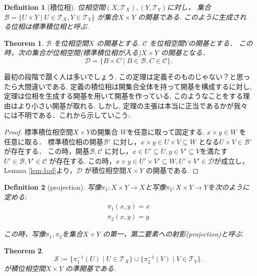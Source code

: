 \documentclass[dvipdfmx]{jbook}
\newtheorem{theorem}{Theorem}[section]
\newtheorem{definition}{Definition}[section]
\theoremstyle{remark}
\theoremstyle{plain}
\begin{document}
\begin{definition}[積位相]
	位相空間$(X,\mathcal{T}_X),(Y,\mathcal{T}_Y)$に対し， 
	集合$\mathcal{B}=\{ U \times Y  \mid U \in \mathcal{T}_X, Y \in \mathcal{T}_Y\}$ が集合$X \times Y$ の開基である.
	このように生成される位相は標準積位相と呼ぶ.
\end{definition}

\begin{theorem}
$\mathcal{B}$ を位相空間$X$ の開基とする.
$\mathcal{C}$ を位相空間$Y$の開基とする．
この時，次の集合が位相空間(標準積位相が入る)$X \times Y$ の開基となる．
\[
\mathcal{D}= \{B \times C  \mid B \in \mathcal{B} , C \in \mathcal{C} \}
.\] 
\end{theorem}

最初の段階で躓く人は多いでしょう.
この定理は定義そのものじゃない？と思ったら大間違いである. 
定義の積位相は開集合全体を持って開基を構成するに対し, 定理は位相を生成する開基を用いて開基を作っている, このようなことをする理由はより小さい開基が取れる. しかし, 定理の主張は本当に正当であるかが我々には不明である．これから示していこう:

\begin{proof}
	標準積位相空間$X \times Y$の開集合 $W$を任意に取って固定する. 
	$x\times y \in W$ を任意に取る．
	標準積位相の開基$\mathcal{B'}$ に対し，$x \times y \in U \times V \subseteq W$ となる$U \times V \in \mathcal{B'}$ が存在する．
	この時，開基$\mathcal{B},\mathcal{C}$ に対し，$x \in U' \subseteq U, y \in V' \subseteq V$を満たす $U' \in \mathcal{B},V' \in \mathcal{C}$ が存在する.
	この時，$x\times y \in U' \times V' \subseteq W,U' \times V' \in \mathcal{D}$が成立し，Lemma \ref{lem:1od}より，$\mathcal{D}$ が積位相空間$X\times Y$ の開基である.
\end{proof}

\begin{definition}[projection]
	写像$\pi_1 : X \times Y \to X$と写像$\pi_2 : X \times Y \to Y$を次のように定める:
	\[
	\begin{aligned}
		\pi_1(x,y) =x \\
		\pi_2(x,y)=y
	\end{aligned}
	\] 

	この時，写像$\pi_1,\pi_2$を集合$X \times Y$ の第一，第二要素への射影(projection)と呼ぶ.
\end{definition}

\begin{theorem}
	\[
	\mathcal{S}:= \{\pi_1^{-1} \left( U \right)  \mid U \in \mathcal{T}_X		\} \cup \{ \pi_2^{-1} \left( V \right)   \mid  V \in \mathcal{T}_Y\} 
	.\] 
	が積位相空間$X \times Y$ の準開基である.
\end{theorem}
\end{document}
